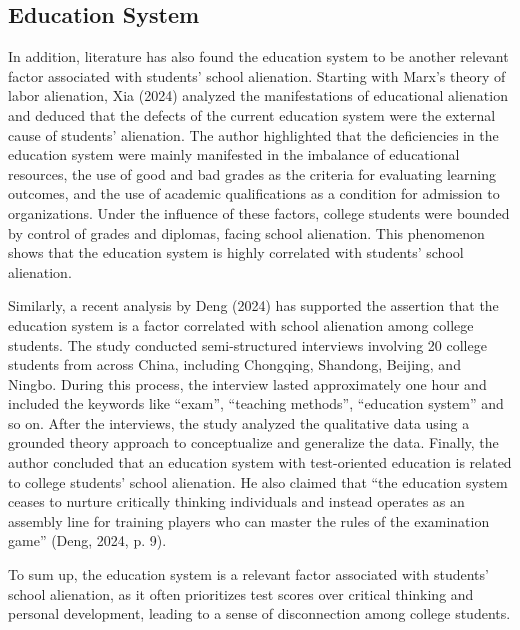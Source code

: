\documentclass{studentpaper}
\begin{document}
\subsection{Education System}
\par
In addition, literature has also found the education system to be another relevant factor 
associated with students’ school alienation. Starting with Marx's theory of labor alienation, Xia 
(2024) analyzed the manifestations of educational alienation and deduced that the defects of the 
current education system were the external cause of students’ alienation. The author highlighted 
that the deficiencies in the education system were mainly manifested in the imbalance of 
educational resources, the use of good and bad grades as the criteria for evaluating learning 
outcomes, and the use of academic qualifications as a condition for admission to organizations. 
Under the influence of these factors, college students were bounded by control of grades and 
diplomas, facing school alienation. This phenomenon shows that the education system is highly 
correlated with students’ school alienation.
\par
Similarly, a recent analysis by Deng (2024) has supported the assertion that the education 
system is a factor correlated with school alienation among college students. The study conducted 
semi-structured interviews involving 20 college students from across China, including Chongqing, 
Shandong, Beijing, and Ningbo. During this process, the interview lasted approximately one hour 
and included the keywords like “exam”, “teaching methods”, “education system” and so on. After 
the interviews, the study analyzed the qualitative data using a grounded theory approach to 
conceptualize and generalize the data. Finally, the author concluded that an education system with 
test-oriented education is related to college students’ school alienation. He also claimed that “the 
education system ceases to nurture critically thinking individuals and instead operates as an 
assembly line for training players who can master the rules of the examination game” (Deng, 2024, 
p. 9).
\par
To sum up, the education system is a relevant factor associated with students’ school 
alienation, as it often prioritizes test scores over critical thinking and personal development, 
leading to a sense of disconnection among college students.
\end{document}
